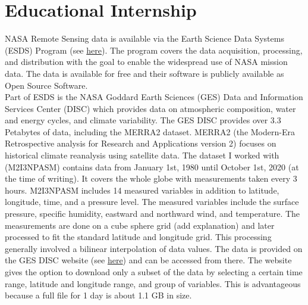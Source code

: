\documentclass[../00_main.tex]{subfiles}
\begin{document}
\section{Educational Internship}

NASA Remote Sensing data is available via the Earth Science Data Systems (ESDS)
Program (see \href{https://earthdata.nasa.gov/esds}{here}). The program covers the
data acquisition, processing, and distribution with the goal to enable the
widespread use of NASA mission data. The data is available for free and their
software is publicly available as Open Source Software.\\ 
Part of ESDS is the NASA Goddard Earth Sciences (GES) Data and Information 
Services Center (DISC) which provides data on atmospheric composition, water
and energy cycles, and climate variability. 
The GES DISC provides over 3.3 Petabytes of data,
including the MERRA2 dataset. MERRA2 (the Modern-Era Retrospective analysis for
Research and Applications version 2) focuses on historical climate reanalysis
using satellite data. The dataset I worked with (M2I3NPASM) contains data from
January 1st, 1980 until October 1st, 2020 (at the time of writing). It covers
the whole globe with measurements taken every 3 hours.
M2I3NPASM includes 14 measured variables in addition to latitude, longitude,
time, and a pressure level. The measured variables include the surface pressure,
specific humidity, eastward and northward wind, and temperature. 
The measurements are done on a cube sphere grid (add explanation) and later
processed to fit the standard latitude and longitude grid. This processing
generally involved a bilinear interpolation of data values.\newline
The data is provided on the GES DISC website (see
\href{https://disc.gsfc.nasa.gov/datasets/M2I3NPASM_5.12.4/summary}{here}) and can be
accessed from there. The website gives the option to download only a subset of
the data by selecting a certain time range, latitude and longitude range, and
group of variables. This is advantageous because a full file for 1 day is about
1.1 GB in size.
\end{document}
